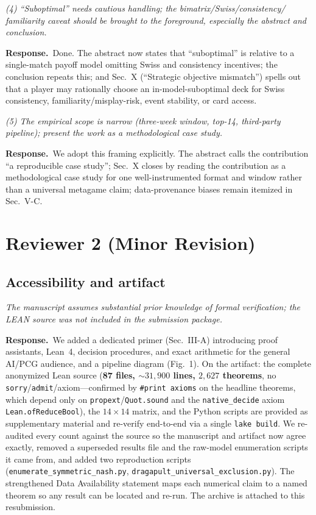 \documentclass[11pt]{article}
\newcommand{\cmt}[1]{\par\smallskip\noindent\textit{#1}\par\smallskip}
\newcommand{\resp}{\par\noindent\textbf{Response.}\ }
\begin{document}
\cmt{(4) ``Suboptimal'' needs cautious handling; the bimatrix/Swiss/consistency/
familiarity caveat should be brought to the foreground, especially the abstract
and conclusion.}
\resp Done. The abstract now states that ``suboptimal'' is relative to a
single-match payoff model omitting Swiss and consistency incentives; the
conclusion repeats this; and Sec.~X (``Strategic objective mismatch'') spells out
that a player may rationally choose an in-model-suboptimal deck for Swiss
consistency, familiarity/misplay-risk, event stability, or card access.

\cmt{(5) The empirical scope is narrow (three-week window, top-14, third-party
pipeline); present the work as a methodological case study.}
\resp We adopt this framing explicitly. The abstract calls the contribution ``a
reproducible case study''; Sec.~X closes by reading the contribution as a
methodological case study for one well-instrumented format and window rather than
a universal metagame claim; data-provenance biases remain itemized in Sec.~V-C.

\hrulefill

\section*{Reviewer 2 (Minor Revision)}

\subsection*{Accessibility and artifact}
\cmt{The manuscript assumes substantial prior knowledge of formal verification;
the LEAN source was not included in the submission package.}
\resp We added a dedicated primer (Sec.~III-A) introducing proof assistants,
Lean~4, decision procedures, and exact arithmetic for the general AI/PCG audience,
and a pipeline diagram (Fig.~1). On the artifact: the complete anonymized Lean
source (\textbf{87 files, ${\sim}31{,}900$ lines, $2{,}627$ theorems}, no
\texttt{sorry}/\texttt{admit}/axiom---confirmed by \texttt{\#print axioms} on the
headline theorems, which depend only on \texttt{propext}/\texttt{Quot.sound} and
the \texttt{native\_decide} axiom \texttt{Lean.ofReduceBool}), the $14\times14$
matrix, and the Python scripts are provided as supplementary material and re-verify
end-to-end via a single \texttt{lake build}. We re-audited every count against the
source so the manuscript and artifact now agree exactly, removed a superseded
results file and the raw-model enumeration scripts it came from, and added two
reproduction scripts (\texttt{enumerate\_symmetric\_nash.py},
\texttt{dragapult\_universal\_exclusion.py}). The strengthened Data Availability
statement maps each numerical claim to a named theorem so any result can be located
and re-run. The archive is attached to this resubmission.
\end{document}
